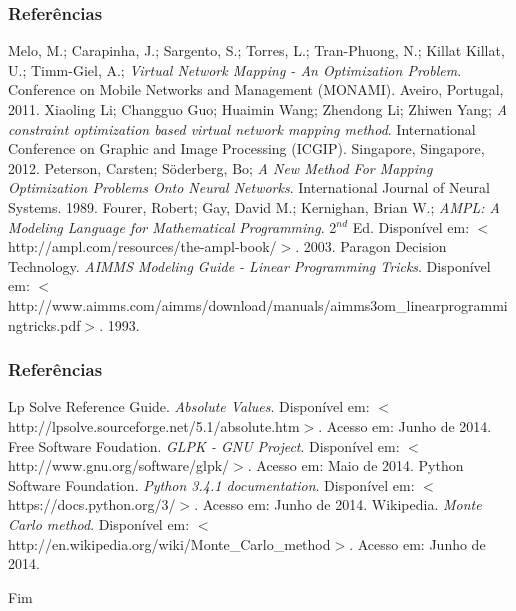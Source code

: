 \documentclass{beamer}
\begin{document}

\begin{frame}
\frametitle{Referências}
\footnotesize{
\begin{thebibliography}{1}
	Melo, M.; Carapinha, J.; Sargento, S.; Torres, L.; Tran-Phuong, N.; Killat Killat, U.; Timm-Giel, A.;
	\emph{Virtual Network Mapping - An Optimization Problem}.
	Conference on Mobile Networks and Management (MONAMI).
	Aveiro, Portugal, 2011.
\bibitem{}
	Xiaoling Li; Changguo Guo; Huaimin Wang; Zhendong Li; Zhiwen Yang;
	\emph{A constraint optimization based virtual network mapping method}.
	International Conference on Graphic and Image Processing (ICGIP).
	Singapore, Singapore, 2012.
\bibitem{}
	Peterson, Carsten; Söderberg, Bo;
	\emph{A New Method For Mapping Optimization Problems Onto Neural Networks}.
	International Journal of Neural Systems.
	1989.
	Fourer, Robert; Gay, David M.; Kernighan, Brian W.;
	\emph{AMPL: A Modeling Language for Mathematical Programming}.
	2$^{nd}$ Ed.
	Disponível em: $<$http://ampl.com/resources/the-ampl-book/$>$.
	2003.
\bibitem{}
	Paragon Decision Technology.
	\emph{AIMMS Modeling Guide - Linear Programming Tricks}.
	Disponível em: $<$http://www.aimms.com/aimms/download/manuals/aimms3om\_linearprogrammingtricks.pdf$>$.
	1993.
\end{thebibliography}
}
\end{frame}

\begin{frame}
\frametitle{Referências}
\footnotesize{
\begin{thebibliography}{6}
	Lp Solve Reference Guide.
	\emph{Absolute Values}.
	Disponível em: $<$http://lpsolve.sourceforge.net/5.1/absolute.htm$>$.
	Acesso em: Junho de 2014.
	Free Software Foudation.
	\emph{GLPK - GNU Project}.
	Disponível em: $<$http://www.gnu.org/software/glpk/$>$.
	Acesso em: Maio de 2014.
	Python Software Foundation.
	\emph{Python 3.4.1 documentation}.
	Disponível em: $<$https://docs.python.org/3/$>$.
	Acesso em: Junho de 2014.
\bibitem{}
	Wikipedia.
	\emph{Monte Carlo method}.
	Disponível em: $<$http://en.wikipedia.org/wiki/Monte\_Carlo\_method$>$.
	Acesso em: Junho de 2014.
\end{thebibliography}
}
\end{frame}

\begin{frame}
\Huge{\centerline{Fim}}
\end{frame}

\end{document}
